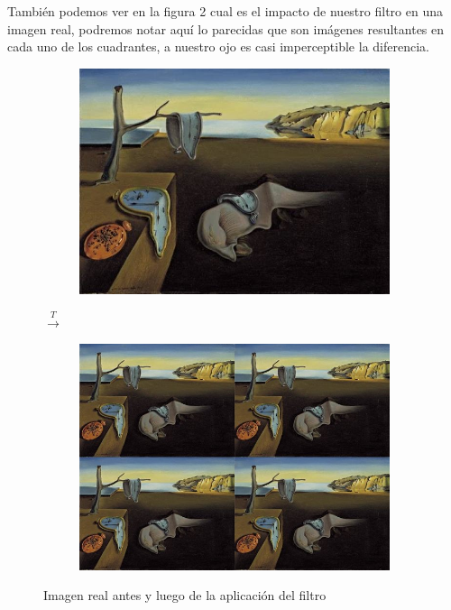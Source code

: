 También podemos ver en la figura 2 cual es el impacto de nuestro filtro en una imagen real, podremos notar aquí lo parecidas que son imágenes resultantes en cada uno de los cuadrantes, a nuestro ojo es casi imperceptible la diferencia.

\begin{figure}[H]
\begin{subfigure}[b]{0.50\textwidth} 
\includegraphics[scale=0.4]{img/fourCombine_before.jpg}
\end{subfigure}
{\LARGE$\xrightarrow{T}$}
\begin{subfigure}[b]{0.50\textwidth} 
\includegraphics[scale=0.4]{img/fourCombine_after.jpg}
\end{subfigure}

\caption{Imagen real antes y luego de la aplicación del filtro}
\end{figure}

